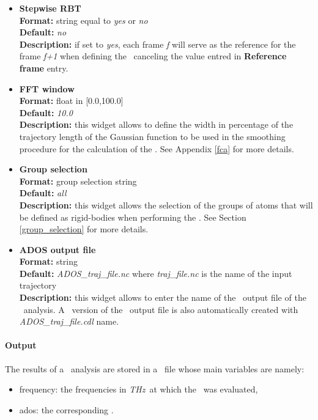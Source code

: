 \documentclass[a4paper,11pt]{report}
\newcommand{\thz}{\textit{THz}}
\begin{document}
\begin{itemize}
\hypertarget{ados_stepwise_rbt}{}
\item \textbf{Stepwise RBT}\\
\textbf{Format:} string equal to \textit{yes} or \textit{no}\\
\textbf{Default:} \textit{no}\\
\textbf{Description:} if set to \textit{yes}, each frame \textit{f} will serve as the reference for the frame \textit{f+1} 
when defining the \RBT\ canceling the value entred in \textbf{Reference frame} entry.

\hypertarget{ados_fft_window}{}
\item \textbf{FFT window}\\
\textbf{Format:} float in [0.0,100.0]\\
\textbf{Default:} \textit{10.0}\\
\textbf{Description:} this widget allows to define the width in percentage of the trajectory length of the Gaussian 
function to be used in the smoothing procedure for the calculation of the \ADOS . See Appendix \ref{fca} for more details.

\hypertarget{ados_group_selection}{}
\item \textbf{Group selection}\\
\textbf{Format:} group selection string\\
\textbf{Default:} \textit{all}\\
\textbf{Description:} this widget allows the selection of the groups of atoms that will be defined as rigid-bodies 
when performing the \ADOS . See Section \ref{group_selection} for more details.

\hypertarget{ados_ados_output_file}{}
\item \textbf{ADOS output file}\\
\textbf{Format:} string\\
\textbf{Default:} \textit{ADOS\_traj\_file.nc} where \textit{traj\_file.nc} is the name of the input trajectory\\
\textbf{Description:} this widget allows to enter the name of the \NetCDF\ output file of the \ADOS\ analysis. A \CDL\ 
version of the \NetCDF\ output file is also automatically created with \textit{ADOS\_traj\_file.cdl} name.
\end{itemize}

\paragraph{Output\\}
The results of a \ADOS\ analysis are stored in a \NetCDF\ file whose main variables are namely:
\begin{itemize}
\item frequency: the frequencies in \thz\ at which the \ADOS\ was evaluated,
\item ados: the corresponding \ADOS .
\end{itemize}
\end{document}
